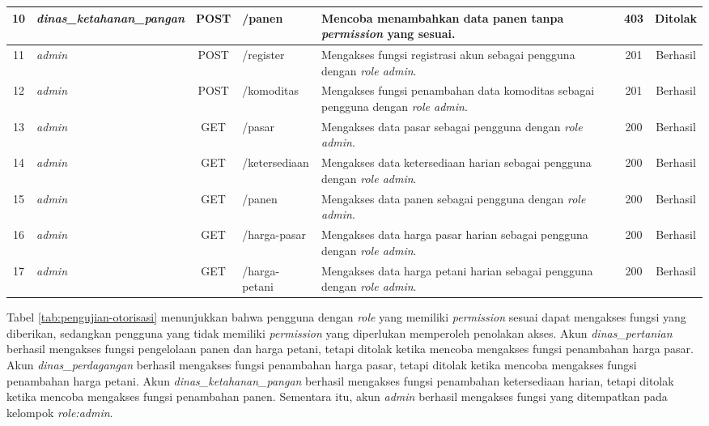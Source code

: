 \begin{longtable}{|c|p{2.4cm}|c|p{2.3cm}|p{2.4cm}|c|c|}
10 & \textit{dinas\_ketahanan\allowbreak \_pangan} & POST & /panen &
Mencoba menambahkan data panen tanpa \textit{permission} yang sesuai. &
403 & Ditolak \\ \hline

11 & \textit{admin} & POST & /register &
Mengakses fungsi registrasi akun sebagai pengguna dengan \textit{role admin}. &
201 & Berhasil \\ \hline

12 & \textit{admin} & POST & /komoditas &
Mengakses fungsi penambahan data komoditas sebagai pengguna dengan \textit{role admin}. &
201 & Berhasil \\ \hline

13 & \textit{admin} & GET & /pasar &
Mengakses data pasar sebagai pengguna dengan \textit{role admin}. &
200 & Berhasil \\ \hline

14 & \textit{admin} & GET & /ketersediaan &
Mengakses data ketersediaan harian sebagai pengguna dengan \textit{role admin}. &
200 & Berhasil \\ \hline

15 & \textit{admin} & GET & /panen &
Mengakses data panen sebagai pengguna dengan \textit{role admin}. &
200 & Berhasil \\ \hline

16 & \textit{admin} & GET & /harga-pasar &
Mengakses data harga pasar harian sebagai pengguna dengan \textit{role admin}. &
200 & Berhasil \\ \hline

17 & \textit{admin} & GET & /harga-petani &
Mengakses data harga petani harian sebagai pengguna dengan \textit{role admin}. &
200 & Berhasil \\ \hline

\end{longtable}

Tabel \ref{tab:pengujian-otorisasi} menunjukkan bahwa pengguna dengan \textit{role} yang memiliki \textit{permission} sesuai dapat mengakses fungsi yang diberikan, sedangkan pengguna yang tidak memiliki \textit{permission} yang diperlukan memperoleh penolakan akses. Akun \textit{dinas\_pertanian} berhasil mengakses fungsi pengelolaan panen dan harga petani, tetapi ditolak ketika mencoba mengakses fungsi penambahan harga pasar. Akun \textit{dinas\_perdagangan} berhasil mengakses fungsi penambahan harga pasar, tetapi ditolak ketika mencoba mengakses fungsi penambahan harga petani. Akun \textit{dinas\allowbreak \_ketahanan\allowbreak \_pangan} berhasil mengakses fungsi penambahan ketersediaan harian, tetapi ditolak ketika mencoba mengakses fungsi penambahan panen. Sementara itu, akun \textit{admin} berhasil mengakses fungsi yang ditempatkan pada kelompok \textit{role:admin}.

